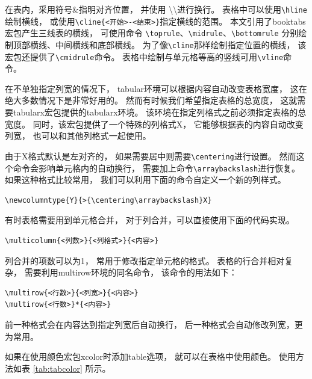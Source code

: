 \documentclass[UTF8]{ctexart}
\numberwithin{equation}{section}			%
\begin{document}
    在表内，采用符号\&指明对齐位置，
    并使用 \textbackslash\textbackslash 进行换行。
    表格中可以使用\verb|\hline|绘制横线，
    或使用\verb|\cline{<开始>-<结束>}|指定横线的范围。
    本文引用了booktabs宏包产生三线表的横线，
    可使用命令
    \verb|\toprule|、\verb|\midrule|、\verb|\bottomrule|
    分别绘制顶部横线、中间横线和底部横线。
    为了像\verb|\cline|那样绘制指定位置的横线，
    该宏包还提供了\verb|\cmidrule|命令。
    表格中绘制与单元格等高的竖线可用\verb|\vline|命令。
    
    在不单独指定列宽的情况下，
    tabular环境可以根据内容自动改变表格宽度，
    这在绝大多数情况下是非常好用的。
    然而有时候我们希望指定表格的总宽度，
    这就需要tabularx宏包提供的tabularx环境。
    该环境在指定列格式之前必须指定表格的总宽度。
    同时，该宏包提供了一个特殊的列格式X，
    它能够根据表的内容自动改变列宽，
    也可以和其他列格式一起使用。
    
    由于X格式默认是左对齐的，
    如果需要居中则需要\verb|\centering|进行设置。
    然而这个命令会影响单元格内的自动换行，
    需要加上命令\verb|\arraybackslash|进行恢复。
    如果这种格式比较常用，
    我们可以利用下面的命令自定义一个新的列样式。
    
\begin{lstlisting}
\newcolumntype{Y}{>{\centering\arraybackslash}X}
\end{lstlisting}
    
    有时表格需要用到单元格合并，
    对于列合并，可以直接使用下面的代码实现。

\begin{lstlisting}
\multicolumn{<列数>}{<列格式>}{<内容>}
\end{lstlisting}

    列合并的项数可以为1，
    常用于修改指定单元格的格式。
    表格的行合并相对复杂，
    需要利用multirow环境的同名命令，
    该命令的用法如下：
    
\begin{lstlisting}
\multirow{<行数>}{<列宽>}{<内容>}
\multirow{<行数>}*{<内容>}
\end{lstlisting}
    
    前一种格式会在内容达到指定列宽后自动换行，
    后一种格式会自动修改列宽，更为常用。
    
    如果在使用颜色宏包xcolor时添加table选项，
    就可以在表格中使用颜色。
    使用方法如表 \ref{tab:tabcolor} 所示。
    
\end{document}
